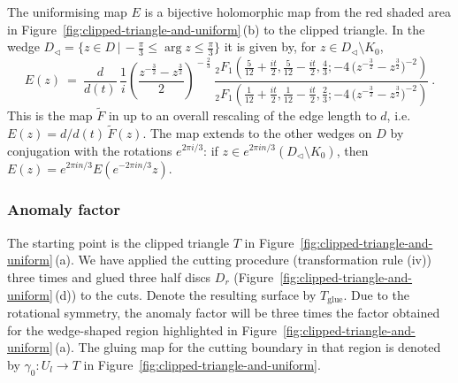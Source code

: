 \documentclass[11pt,a4paper]{article}
\numberwithin{equation}{section}
\begin{document}
The uniformising map $E$ is a bijective holomorphic map from the red shaded area in Figure~\ref{fig:clipped-triangle-and-uniform}\,(b) to the clipped triangle. In the wedge $D_\triangleleft = \{ z \in D \,| \, - \tfrac{\pi}3 \le \arg z \le  \tfrac{\pi}3 \}$ it is given by, for $z \in D_\triangleleft \setminus K_0$,
%
\begin{equation}\label{eq:uniform}   
    E(z) ~=~ \frac{d}{d(t)} \, \frac{1}{i}\left(\frac{z^{-\frac32}-z^{\frac{3}{2}}}{2}\right)^{\!\!-\frac{2}{3}}
    ~
    \frac{_2F_1\!\left(\frac{5}{12}+\frac{it}{2},\frac{5}{12}-\frac{it}{2},\frac{4}{3};
    -4\,\big(z^{-\frac32}-z^{\frac{3}{2}}\big)^{-2}
    \right)}{_2F_1\!\left(\frac{1}{12}+\frac{it}{2},\frac{1}{12}-\frac{it}{2},\frac{2}{3};
    -4\,\big(z^{-\frac32}-z^{\frac{3}{2}}\big)^{-2}
    \right)} ~.
\end{equation}
%
This is the map $\tilde F$ in \cite[Eqn.\,(6.10)\,\&\,Fig.\,15]{Brehm:2021wev} up to an overall rescaling of the edge length to $d$, i.e.\ $E(z) = d/d(t) \, \tilde F(z)$.
The map extends to the other wedges on $D$ by conjugation with the rotations $e^{2 \pi i /3}$: if $z \in e^{2 \pi i n/3} ( D_\triangleleft \setminus K_0 )$, then $E(z) = e^{2 \pi i n/3} E(e^{-2 \pi i n/3} z)$. 

\subsubsection{Anomaly factor}

The starting point is the clipped triangle $T$ in Figure~\ref{fig:clipped-triangle-and-uniform}\,(a). We have applied the cutting procedure (transformation rule (iv)) three times and glued three half discs $D_r$ (Figure~\ref{fig:clipped-triangle-and-uniform}\,(d)) to the cuts. Denote the resulting surface by $T_{\text{glue}}$. Due to the rotational symmetry, the anomaly factor will be three times the factor obtained for the wedge-shaped region highlighted in Figure~\ref{fig:clipped-triangle-and-uniform}\,(a). The gluing map for the cutting boundary in that region is denoted by $\gamma_0 : U_l \to T$ in  Figure~\ref{fig:clipped-triangle-and-uniform}.
\end{document}
